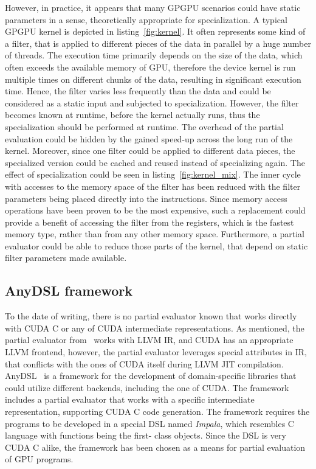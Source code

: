 However, in practice, it appears that many GPGPU scenarios could have static parameters in a sense, theoretically appropriate for specialization.
A typical GPGPU kernel is depicted in listing~\ref{fig:kernel}.
It often represents some kind of a filter, that is applied to different pieces of the data in parallel by a huge number of threads.
The execution time primarily depends on the size of the data, which often exceeds the available memory of GPU, therefore the device kernel is run multiple times on different chunks of the data, resulting in significant execution time.
Hence, the filter varies less frequently than the data and could be considered as a static input and subjected to specialization.
However, the filter becomes known at runtime, before the kernel actually runs, thus the specialization should be performed at runtime.
The overhead of the partial evaluation could be hidden by the gained speed-up across the long run of the kernel.
Moreover, since one filter could be applied to different data pieces, the specialized version could be cached and reused instead of specializing again. The effect of specialization could be seen in listing~\ref{fig:kernel_mix}.
The inner cycle with accesses to the memory space of the filter has been reduced with the filter parameters being placed directly into the instructions.
Since memory access operations have been proven to be the most expensive, such a replacement could provide a benefit of accessing the filter from the registers, which is the fastest memory type, rather than from any other memory space.
Furthermore, a partial evaluator could be able to reduce those parts of the kernel, that depend on static filter parameters made available.

\subsection{AnyDSL framework}
To the date of writing, there is no partial evaluator known that works directly with CUDA C or any of CUDA intermediate representations.
As mentioned, the partial evaluator from~\cite{LLVM-mix} works with LLVM IR, and CUDA has an appropriate LLVM frontend, however, the partial evaluator leverages special attributes in IR, that conflicts with the ones of CUDA itself during LLVM JIT compilation.
AnyDSL~\cite{LeiBa} is a framework for the development of domain-specific libraries that could utilize different backends, including the one of CUDA.
The framework includes a partial evaluator that works with a specific intermediate representation, supporting CUDA C code generation.
The framework requires the programs to be developed in a special DSL named \emph{Impala}, which resembles C language with functions being the first- class objects.
Since the DSL is very CUDA C alike, the framework has been chosen as a means for partial evaluation of GPU programs.

